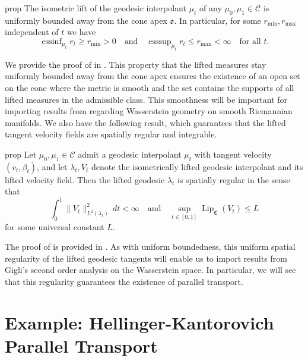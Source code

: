 \documentclass[11pt]{article}
\DeclareMathOperator{\esssup}{esssup}
\begin{document}
\begin{restatable}{prop}{} \label{uniformly bounded lifts}
    The isometric lift of the geodesic interpolant $\mu_t$ of any $\mu_0, \mu_1 \in \mathcal{C}$ is uniformly bounded away from the cone apex $\mathfrak{o}$. In particular, for some $r_{\min}, r_{\max}$ independent of $t$ we have
    \[\operatorname{essinf}_{\mu_t} r_t \geq r_{\min} > 0 \quad \text{and} \quad \esssup_{\mu_t} r_t \leq r_{\max} < \infty \quad \text{for all $t$.}\]
    
\end{restatable}
We provide the proof of  in . This property that the lifted measures stay uniformly bounded away from the cone apex ensures the existence of an open set on the cone where the metric is smooth and the set contains the supports of all lifted measures in the admissible class. This smoothness will be important for importing results from \citet{gigli2012second} regarding Wasserstein geometry on smooth Riemannian manifolds. 
We also have the following result, which guarantees that the lifted tangent velocity fields are spatially regular and integrable. 

\begin{restatable}{prop}{} \label{uniformly regular lifts}
    Let $\mu_0, \mu_1 \in \mathcal{C}$ admit a geodesic interpolant $\mu_t$ with tangent velocity $(v_t, \beta_t)$, and let $\lambda_t, V_t$ denote the isometrically lifted geodesic interpolant and its lifted velocity field. Then the lifted geodesic $\lambda_t$ is spatially regular in the sense that 
    \[  \int_0^1 \|V_t\|_{L^2(\lambda_t)}^2 \, dt < \infty  \quad \text{and} \quad\sup_{t\in[0,1]}\operatorname{Lip}_{\mathfrak{C}}(V_t) \leq L\]
    for some universal constant $L$.
\end{restatable}

The proof of  is provided in . As with uniform boundedness, this uniform spatial regularity of the lifted geodesic tangents will enable us to import results from Gigli's second order analysis on the Wasserstein space. In particular, we will see that this regularity guarantees the existence of parallel transport. 




\section{Example: Hellinger-Kantorovich Parallel Transport}
\end{document}
